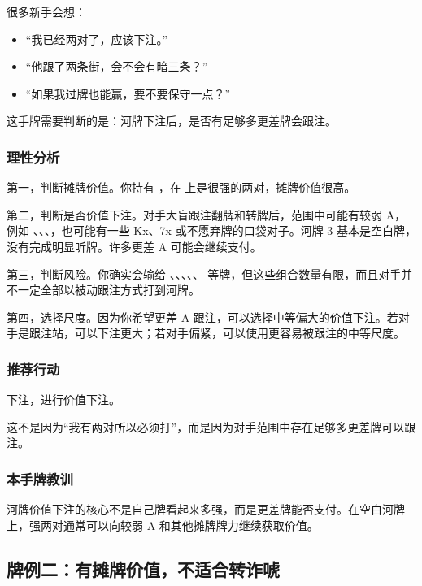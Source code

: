 很多新手会想：

\begin{itemize}
\item “我已经两对了，应该下注。”
\item “他跟了两条街，会不会有暗三条？”
\item “如果我过牌也能赢，要不要保守一点？”
\end{itemize}

这手牌需要判断的是：河牌下注后，是否有足够多更差牌会跟注。

\subsubsection*{理性分析}

第一，判断摊牌价值。你持有 ，在  上是很强的两对，摊牌价值很高。

第二，判断是否价值下注。对手大盲跟注翻牌和转牌后，范围中可能有较弱 A，例如 、、、，也可能有一些 Kx、7x 或不愿弃牌的口袋对子。河牌 3 基本是空白牌，没有完成明显听牌。许多更差 A 可能会继续支付。

第三，判断风险。你确实会输给 、、、、、 等牌，但这些组合数量有限，而且对手并不一定全部以被动跟注方式打到河牌。

第四，选择尺度。因为你希望更差 A 跟注，可以选择中等偏大的价值下注。若对手是跟注站，可以下注更大；若对手偏紧，可以使用更容易被跟注的中等尺度。

\subsubsection*{推荐行动}

下注，进行价值下注。

这不是因为“我有两对所以必须打”，而是因为对手范围中存在足够多更差牌可以跟注。

\subsubsection*{本手牌教训}

河牌价值下注的核心不是自己牌看起来多强，而是更差牌能否支付。在空白河牌上，强两对通常可以向较弱 A 和其他摊牌牌力继续获取价值。

\subsection{牌例二：有摊牌价值，不适合转诈唬}


